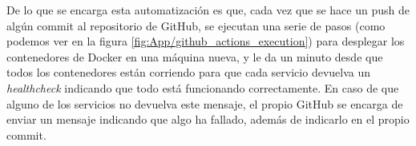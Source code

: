 De lo que se encarga esta automatización es que, cada vez que se hace un push de algún commit al repositorio de GitHub, se ejecutan una serie de pasos (como podemos ver en la figura \ref{fig:App/github_actions_execution}) para desplegar los contenedores de Docker en una máquina nueva, y le da un minuto desde que todos los contenedores están corriendo para que cada servicio devuelva un \textit{healthcheck} indicando que todo está funcionando correctamente. En caso de que alguno de los servicios no devuelva este mensaje, el propio GitHub se encarga de enviar un mensaje indicando que algo ha fallado, además de indicarlo en el propio commit.


